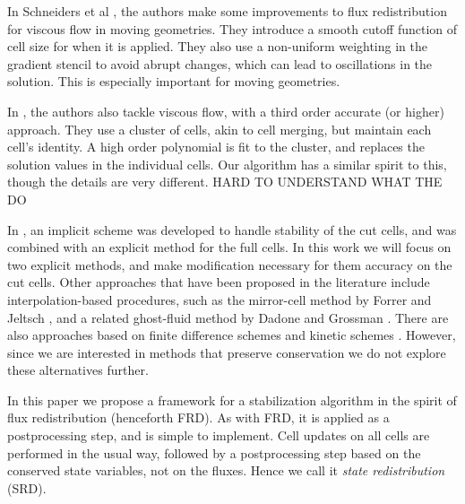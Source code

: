 In Schneiders et al \cite{shws:2011}, the authors make
some improvements to flux redistribution for viscous flow in moving
geometries. They introduce a
smooth cutoff function of cell size for when it is applied. They also
use a non-uniform weighting in the gradient stencil to avoid abrupt
changes, which can lead to oscillations in the solution. This is
especially important for moving geometries.

In \cite{BalajiMenon:2016}, the authors also tackle viscous flow, with a
third order accurate (or higher) approach. They use a cluster of cells,
akin to cell merging, but maintain each cell's identity. A high order
polynomial is fit to the cluster, and replaces the solution values in the
individual cells.  Our algorithm has a similar spirit to this, though the
details are very different. HARD TO UNDERSTAND WHAT THE DO

In \cite{May-Berger:JSC}, an implicit scheme was developed to
handle stability of the cut cells, and was combined with an 
explicit method for the full cells. In this work we will focus on 
two explicit methods, and make modification necessary for them accuracy 
on the cut cells.
Other approaches that have been proposed in the literature include
interpolation-based procedures, such as the mirror-cell method by Forrer
and Jeltsch \cite{article:FoJe98}, and a related ghost-fluid method by
Dadone and Grossman \cite{DadoneGrossman}.
There are also approaches based on finite difference schemes
\cite{SjogreenPetersson,MarcoBjorn}
and kinetic schemes \cite{Oksuzoglu:thesis,KeenKarni}.
However, since we are interested in methods
that preserve conservation we do not explore these alternatives further.

In this paper we propose a framework for a stabilization algorithm in
the spirit of flux redistribution (henceforth FRD). 
As with FRD, it is applied as a postprocessing
step, and is simple to implement. Cell updates on all cells are performed
in the usual way, followed by a postprocessing step based on the
conserved state variables, not on the fluxes.
Hence we call it {\em state redistribution} (SRD).


